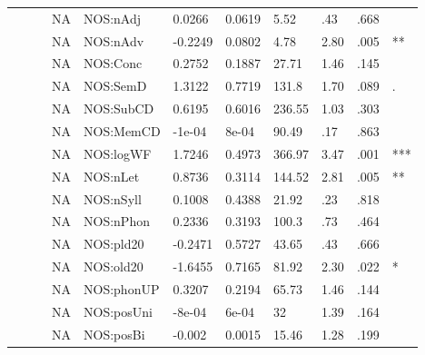 \begin{table}[ht]
\begin{tabular}{lllllllllll}
   &  &  & NA & NOS:nAdj & 0.0266 & 0.0619 & 5.52 & .43 & .668 &   \\ 
   &  &  & NA & NOS:nAdv & -0.2249 & 0.0802 & 4.78 & 2.80 & .005 & ** \\ 
   &  &  & NA & NOS:Conc & 0.2752 & 0.1887 & 27.71 & 1.46 & .145 &   \\ 
   &  &  & NA & NOS:SemD & 1.3122 & 0.7719 & 131.8 & 1.70 & .089 & . \\ 
   &  &  & NA & NOS:SubCD & 0.6195 & 0.6016 & 236.55 & 1.03 & .303 &   \\ 
   &  &  & NA & NOS:MemCD & -1e-04 & 8e-04 & 90.49 & .17 & .863 &   \\ 
   &  &  & NA & NOS:logWF & 1.7246 & 0.4973 & 366.97 & 3.47 & .001 & *** \\ 
   &  &  & NA & NOS:nLet & 0.8736 & 0.3114 & 144.52 & 2.81 & .005 & ** \\ 
   &  &  & NA & NOS:nSyll & 0.1008 & 0.4388 & 21.92 & .23 & .818 &   \\ 
   &  &  & NA & NOS:nPhon & 0.2336 & 0.3193 & 100.3 & .73 & .464 &   \\ 
   &  &  & NA & NOS:pld20 & -0.2471 & 0.5727 & 43.65 & .43 & .666 &   \\ 
   &  &  & NA & NOS:old20 & -1.6455 & 0.7165 & 81.92 & 2.30 & .022 & * \\ 
   &  &  & NA & NOS:phonUP & 0.3207 & 0.2194 & 65.73 & 1.46 & .144 &   \\ 
   &  &  & NA & NOS:posUni & -8e-04 & 6e-04 & 32 & 1.39 & .164 &   \\ 
   &  &  & NA & NOS:posBi & -0.002 & 0.0015 & 15.46 & 1.28 & .199 &   \\ 
   \hline
\end{tabular}
\endgroup
\end{table}

